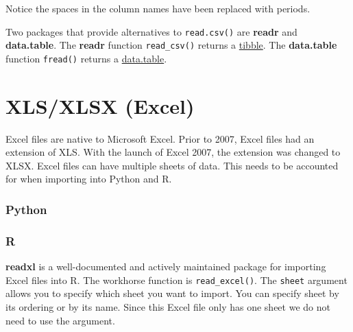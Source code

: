 \documentclass[
]{book}
\begin{document}
Notice the spaces in the column names have been replaced with periods.

Two packages that provide alternatives to \texttt{read.csv()} are \textbf{readr} and \textbf{data.table}. The \textbf{readr} function \texttt{read\_csv()} returns a \href{https://r4ds.had.co.nz/tibbles.html}{tibble}. The \textbf{data.table} function \texttt{fread()} returns a \href{https://rdatatable.gitlab.io/data.table/articles/datatable-intro.html}{data.table}.

\hypertarget{xlsxlsx-excel}{%
\section{XLS/XLSX (Excel)}\label{xlsxlsx-excel}}

Excel files are native to Microsoft Excel. Prior to 2007, Excel files had an extension of XLS. With the launch of Excel 2007, the extension was changed to XLSX. Excel files can have multiple sheets of data. This needs to be accounted for when importing into Python and R.

\hypertarget{python-11}{%
\subsubsection*{Python}\label{python-11}}

\hypertarget{r-11}{%
\subsubsection*{R}\label{r-11}}

\textbf{readxl} is a well-documented and actively maintained package for importing Excel files into R. The workhorse function is \texttt{read\_excel()}. The \texttt{sheet} argument allows you to specify which sheet you want to import. You can specify sheet by its ordering or by its name. Since this Excel file only has one sheet we do not need to use the argument.
\end{document}
